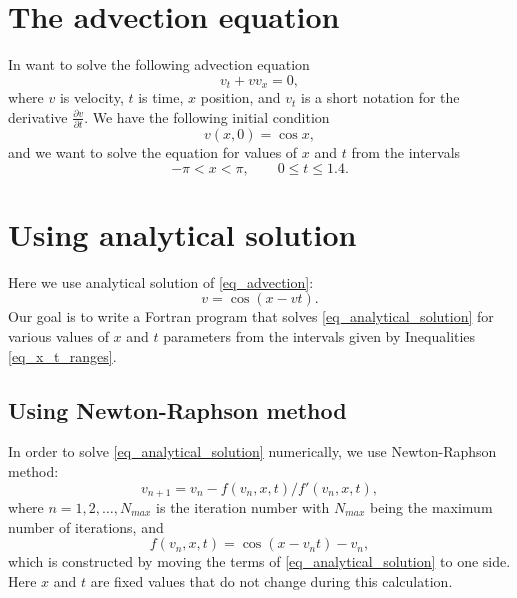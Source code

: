 \section{The advection equation}

In want to solve the following advection equation
\begin{equation}
  v_t + v v_x = 0,
  \label{eq_advection}
\end{equation}
where $v$ is velocity, $t$ is time, $x$ position, and $v_t$ is a short notation for the derivative $\frac{\partial v}{\partial t}$. We have the following initial condition
\begin{equation}
  v(x, 0) = \cos x,
  \label{eq_advection_intial_condition}
\end{equation}
and we want to solve the equation for values of $x$ and $t$ from the intervals
\begin{equation}
  -\pi < x < \pi, \quad \quad 0 \leq t \leq 1.4.
  \label{eq_x_t_ranges}
\end{equation}


\section{Using analytical solution}

Here we use analytical solution of \autoref{eq_advection}:
\begin{equation}
  v = \cos (x - v t ).
  \label{eq_analytical_solution}
\end{equation}
Our goal is to write a Fortran program that solves \autoref{eq_analytical_solution} for various values of $x$ and $t$ parameters from the intervals given by Inequalities \ref{eq_x_t_ranges}.

\subsection{Using Newton-Raphson method}

In order to solve \autoref{eq_analytical_solution} numerically, we use Newton-Raphson method:
\begin{equation}
  v_{n+1} = v_n - f(v_n, x, t) / f'(v_n, x, t),
  \label{eq_recurrence}
\end{equation}
where $n=1, 2, \dots, N_{max}$ is the iteration number with $N_{max}$ being the maximum number of iterations, and
\[
  f(v_n, x, t) = \cos (x - v_n t) - v_n,
\]
which is constructed by moving the terms of \autoref{eq_analytical_solution} to one side. Here $x$ and $t$ are fixed values that do not change during this calculation.

